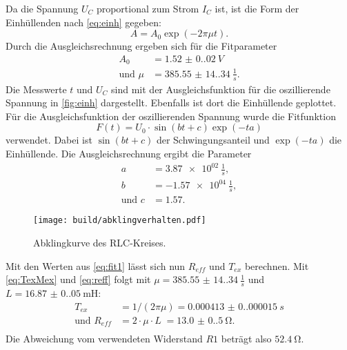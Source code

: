 Da die Spannung $U_C$ proportional zum Strom $I_C$ ist, ist die Form der Einhüllenden nach \autoref{eq:einh} gegeben:
\begin{equation*}
  A = A_0 \exp(-2 \pi \mu t).
\end{equation*}
Durch die Ausgleichsrechnung ergeben sich für die Fitparameter
\begin{align}
  A_0 &= \SI{1.52(0.02)}{V} \\
  \text{und } \mu &= \SI{385.55(14.34)}{\frac{1}{s}}.
  \label{eq:fit1}
\end{align}
Die Messwerte $t$ und $U_C$ sind mit der Ausgleichsfunktion für die oszillierende Spannung in \autoref{fig:einh} dargestellt. Ebenfalls ist dort die Einhüllende
geplottet.
Für die Ausgleichsfunktion der oszillierenden Spannung wurde die Fitfunktion
\begin{equation*}
  F(t) = U_0 \cdot \sin(bt+c) \exp(-ta)
\end{equation*}
verwendet. Dabei ist $\sin(bt+c)$ der Schwingungsanteil und $\exp(-ta)$ die Einhüllende. 
Die Ausgleichsrechnung ergibt die Parameter
\begin{align*}
  a &= \SI{3.87e02}{\frac{1}{s}},\\
  b &= \SI{-1.57e04}{\frac{1}{s}},\\
  \text{und } c &= \SI{1.57}.
\end{align*}
\begin{figure}[H]
  \texttt{[image: build/abklingverhalten.pdf]}
  \caption{Abklingkurve des RLC-Kreises.}
  \label{fig:einh}
\end{figure}
Mit den Werten aus \autoref{eq:fit1} lässt sich nun $R_{eff}$ und $T_{ex}$ berechnen. Mit \autoref{eq:TexMex} und \autoref{eq:reff} folgt mit 
$\mu = \SI{385.55(14.34)}{\frac{1}{s}}$ und $L = \SI{16.87(0.05)}{\milli\henry}$:
\begin{align*}
  T_{ex} &= 1/(2\pi\mu)                      = \SI{0.000413(0.000015)}{s}\\
  \text{und } R_{eff} &= 2 \cdot \mu \cdot L \; = \SI{13.0(0.5)}{\ohm}.\\
\end{align*}
Die Abweichung vom verwendeten Widerstand $R1$ beträgt also $\SI{52.4}{\ohm}$.

